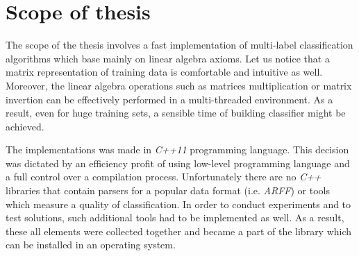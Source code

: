 \section{Scope of thesis}

The scope of the thesis involves a fast implementation of multi-label classification algorithms which base mainly on linear algebra axioms. Let us notice that a matrix representation of training data is comfortable and intuitive as well. Moreover, the linear algebra operations such as matrices multiplication or matrix invertion can be effectively performed in a multi-threaded environment.  As a result, even for huge training sets, a sensible time of building classifier might be achieved. 

The implementations was made in \textit{C++11} programming language. This decision was dictated by an efficiency profit of using low-level programming language and a full control over a compilation process. Unfortunately there are no \textit{C++} libraries that contain parsers for a popular data format (i.e. \textit{ARFF}) or tools which measure a quality of classification. In order to conduct experiments and to test solutions, such additional tools had to be implemented as well. As a result, these all elements were collected together and became a part of the library which can be installed in an operating system.
